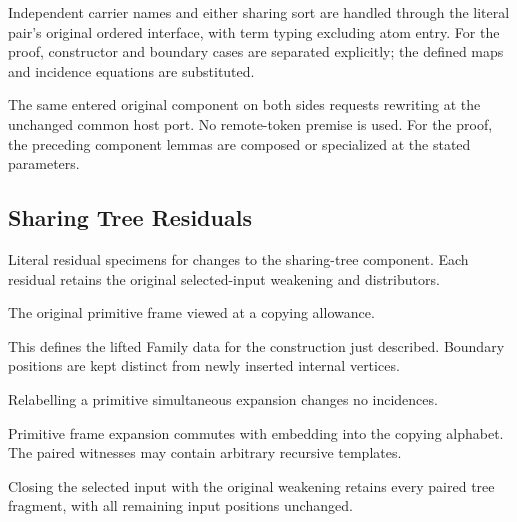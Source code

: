 Independent carrier names and either sharing sort are handled through the literal pair's original ordered interface, with term typing excluding atom entry.
For the proof, constructor and boundary cases are separated explicitly; the defined maps and incidence equations are substituted.
\par{}

The same entered original component on both sides requests rewriting at the unchanged common host port. No remote-token premise is used.
For the proof, the preceding component lemmas are composed or specialized at the stated parameters.
\par{}

\subsection{Sharing Tree Residuals}
Literal residual specimens for changes to the sharing-tree component. Each residual retains the original selected-input weakening and distributors.

The original primitive frame viewed at a copying allowance.
\par{}

This defines the lifted Family data for the construction just described. Boundary positions are kept distinct from newly inserted internal vertices.
\par{}

Relabelling a primitive simultaneous expansion changes no incidences.
\par{}

Primitive frame expansion commutes with embedding into the copying alphabet. The paired witnesses may contain arbitrary recursive templates.
\par{}

Closing the selected input with the original weakening retains every paired tree fragment, with all remaining input positions unchanged.
\par{}

